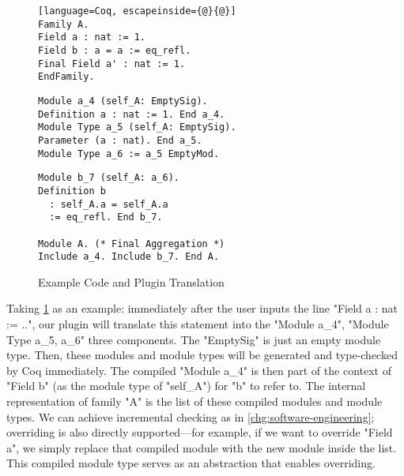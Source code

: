 \begin{figure}[!htb]
  \begin{minipage}[t]{0.30\linewidth}
\begin{lstlisting}[language=Coq, escapeinside={@}{@}]
Family A.
Field a : nat := 1.
Field b : a = a := eq_refl.
Final Field a' : nat := 1. 
EndFamily.
\end{lstlisting}
  \end{minipage}%
  \begin{minipage}[t]{0.35\linewidth}
\begin{verbatim}
Module a_4 (self_A: EmptySig).
Definition a : nat := 1. End a_4.
Module Type a_5 (self_A: EmptySig).
Parameter (a : nat). End a_5.
Module Type a_6 := a_5 EmptyMod.
\end{verbatim}
  \end{minipage}
  \begin{minipage}[t]{0.3\linewidth}
\begin{verbatim}
Module b_7 (self_A: a_6).
Definition b 
  : self_A.a = self_A.a 
  := eq_refl. End b_7.
  
Module A. (* Final Aggregation *)
Include a_4. Include b_7. End A.
\end{verbatim}
  \end{minipage}
  \caption{Example Code and Plugin Translation}\label{fig:plugin-example1}
\end{figure}


Taking \cref{fig:plugin-example1} as an example: immediately after the user inputs the line "Field a : nat := ..", our plugin will
translate this statement into the "Module a_4", "Module Type a_5, a_6"
three components.
{The "EmptySig" is just an empty module type.} Then,
these modules and module types will be generated and type-checked by Coq
immediately. The compiled "Module a_4" is then part of the context of
"Field b" (as the module type of "self_A") for "b" to refer to. The
internal representation of family "A" is the list of these
compiled modules and module types. We can achieve incremental
checking as in \ref{chg:software-engineering}; overriding is also directly supported---for example, if we
want to override "Field a", we simply replace that compiled module with
the new module inside the list. This compiled module type serves as an
abstraction that enables overriding. 



